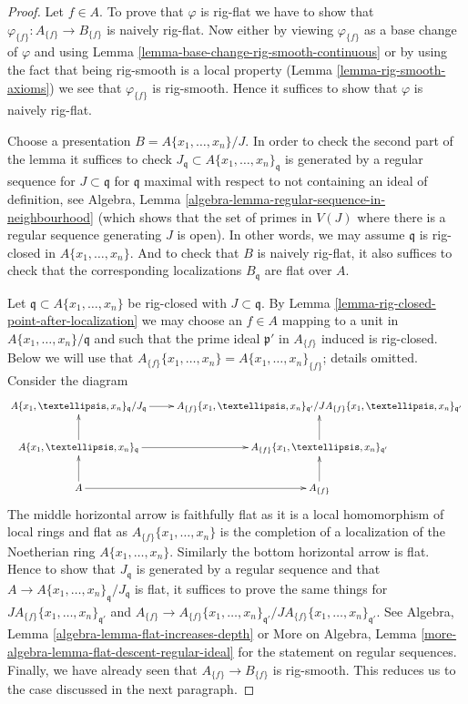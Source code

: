 \documentclass{stacks-project}
\theoremstyle{plain}
\theoremstyle{definition}
\theoremstyle{remark}
\numberwithin{equation}{subsection}
\begin{document}
\begin{proof}
Let $f \in A$. To prove that $\varphi$ is rig-flat we have to show
that $\varphi_{\{f\}} : A_{\{f\}} \to B_{\{f\}}$ is naively rig-flat.
Now either by viewing $\varphi_{\{f\}}$ as a base change of $\varphi$
and using Lemma \ref{lemma-base-change-rig-smooth-continuous}
or by using the fact that being rig-smooth
is a local property (Lemma \ref{lemma-rig-smooth-axioms}) we see that
$\varphi_{\{f\}}$ is rig-smooth. Hence it suffices to show
that $\varphi$ is naively rig-flat.

\medskip\noindent
Choose a presentation $B = A\{x_1, \ldots, x_n\}/J$.
In order to check the second part of the lemma it suffices
to check $J_\mathfrak q \subset A\{x_1, \ldots, x_n\}_\mathfrak q$
is generated by a regular sequence for $J \subset \mathfrak q$
for $\mathfrak q$ maximal with respect to not containing
an ideal of definition, see
Algebra, Lemma \ref{algebra-lemma-regular-sequence-in-neighbourhood}
(which shows that the set of primes in $V(J)$ where there is
a regular sequence generating $J$ is open).
In other words, we may assume $\mathfrak q$ is rig-closed
in $A\{x_1, \ldots, x_n\}$. And to check that
$B$ is naively rig-flat, it also suffices to
check that the corresponding localizations $B_\mathfrak q$
are flat over $A$.

\medskip\noindent
Let $\mathfrak q \subset A\{x_1, \ldots, x_n\}$ be rig-closed with
$J \subset \mathfrak q$. By
Lemma \ref{lemma-rig-closed-point-after-localization}
we may choose an $f \in A$ mapping to a unit in
$A\{x_1, \ldots, x_n\}/\mathfrak q$ and such
that the prime ideal $\mathfrak p'$ in $A_{\{f\}}$ induced is rig-closed.
Below we will use that
$A_{\{f\}}\{x_1, \ldots, x_n\} = A\{x_1, \ldots, x_n\}_{\{f\}}$;
details omitted. Consider the diagram
$$
\xymatrix{
A\{x_1, \ldots, x_n\}_{\mathfrak q} / J_\mathfrak q \ar[r] &
A_{\{f\}}\{x_1, \ldots, x_n\}_{\mathfrak q'}/
J A_{\{f\}}\{x_1, \ldots, x_n\}_{\mathfrak q'} \\
A\{x_1, \ldots, x_n\}_{\mathfrak q} \ar[r] \ar[u] &
A_{\{f\}}\{x_1, \ldots, x_n\}_{\mathfrak q'} \ar[u] \\
A \ar[r] \ar[u] &
A_{\{f\}} \ar[u]
}
$$
The middle horizontal arrow is faithfully flat as it is a local
homomorphism of local rings and flat as $A_{\{f\}}\{x_1, \ldots, x_n\}$
is the completion of a localization of the Noetherian ring
$A\{x_1, \ldots, x_n\}$. Similarly the bottom horizontal arrow is flat.
Hence to show that $J_\mathfrak q$ is generated by a regular sequence
and that $A \to A\{x_1, \ldots, x_n\}_{\mathfrak q} / J_\mathfrak q$
is flat, it suffices to prove the same things for
$J A_{\{f\}}\{x_1, \ldots, x_n\}_{\mathfrak q'}$ and
$A_{\{f\}} \to A_{\{f\}}\{x_1, \ldots, x_n\}_{\mathfrak q'}/
J A_{\{f\}}\{x_1, \ldots, x_n\}_{\mathfrak q'}$.
See Algebra, Lemma \ref{algebra-lemma-flat-increases-depth} or
More on Algebra, Lemma \ref{more-algebra-lemma-flat-descent-regular-ideal}
for the statement on regular sequences. Finally, we have already seen that
$A_{\{f\}} \to B_{\{f\}}$ is rig-smooth.
This reduces us to the case discussed in the next paragraph.


\end{proof}
\end{document}
